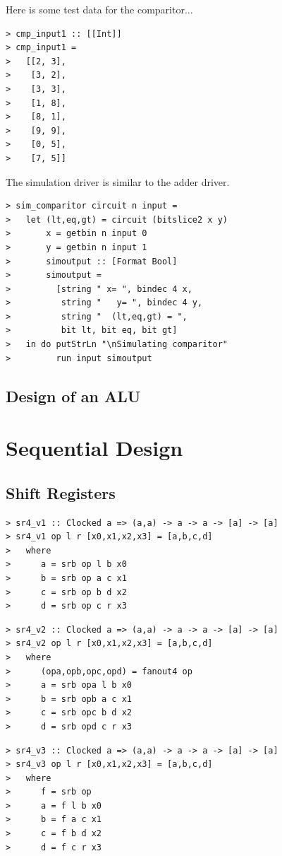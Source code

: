 \documentclass[a4paper,openany,fleqn]{book}
\begin{document}
Here is some test data for the comparitor...

\begin{verbatim}
> cmp_input1 :: [[Int]]
> cmp_input1 =
>   [[2, 3],
>    [3, 2],
>    [3, 3],
>    [1, 8],
>    [8, 1],
>    [9, 9],
>    [0, 5],
>    [7, 5]]
\end{verbatim}

The simulation driver is similar to the adder driver.

\begin{verbatim}
> sim_comparitor circuit n input =
>   let (lt,eq,gt) = circuit (bitslice2 x y)
>       x = getbin n input 0
>       y = getbin n input 1
>       simoutput :: [Format Bool]
>       simoutput =
>         [string " x= ", bindec 4 x,
>          string "   y= ", bindec 4 y,
>          string "  (lt,eq,gt) = ",
>          bit lt, bit eq, bit gt]
>   in do putStrLn "\nSimulating comparitor"
>         run input simoutput
\end{verbatim}

\section{Design of an ALU}
\label{sec:design-ALU}

\chapter{Sequential Design}
\label{sec:sequential-design}

\section{Shift Registers}
\label{sec:shift-registers}

\begin{verbatim}
> sr4_v1 :: Clocked a => (a,a) -> a -> a -> [a] -> [a]
> sr4_v1 op l r [x0,x1,x2,x3] = [a,b,c,d]
>   where
>      a = srb op l b x0
>      b = srb op a c x1
>      c = srb op b d x2
>      d = srb op c r x3
\end{verbatim}

\begin{verbatim}
> sr4_v2 :: Clocked a => (a,a) -> a -> a -> [a] -> [a]
> sr4_v2 op l r [x0,x1,x2,x3] = [a,b,c,d]
>   where
>      (opa,opb,opc,opd) = fanout4 op
>      a = srb opa l b x0
>      b = srb opb a c x1
>      c = srb opc b d x2
>      d = srb opd c r x3
\end{verbatim}

\begin{verbatim}
> sr4_v3 :: Clocked a => (a,a) -> a -> a -> [a] -> [a]
> sr4_v3 op l r [x0,x1,x2,x3] = [a,b,c,d]
>   where
>      f = srb op
>      a = f l b x0
>      b = f a c x1
>      c = f b d x2
>      d = f c r x3
\end{verbatim}
\end{document}
